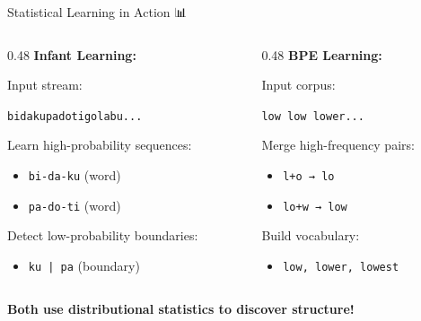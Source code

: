 \documentclass[aspectratio=169]{beamer}
\begin{document}
\begin{frame}[shrink=10]{Statistical Learning in Action 📊}
    \begin{columns}[T]
        \begin{column}{0.48\textwidth}
            \textbf{Infant Learning:}

            Input stream:
            \begin{center}
                \texttt{bidakupadotigolabu...}
            \end{center}

            Learn high-probability sequences:
            \begin{itemize}\setlength{\itemsep}{0pt}
                \item \texttt{bi-da-ku} (word)
                \item \texttt{pa-do-ti} (word)
            \end{itemize}

            Detect low-probability boundaries:
            \begin{itemize}\setlength{\itemsep}{0pt}
                \item \texttt{ku | pa} (boundary)
            \end{itemize}
        \end{column}
        \begin{column}{0.48\textwidth}
            \textbf{BPE Learning:}

            Input corpus:
            \begin{center}
                \texttt{low low lower...}
            \end{center}

            Merge high-frequency pairs:
            \begin{itemize}\setlength{\itemsep}{0pt}
                \item \texttt{l+o → lo}
                \item \texttt{lo+w → low}
            \end{itemize}

            Build vocabulary:
            \begin{itemize}\setlength{\itemsep}{0pt}
                \item \texttt{low, lower, lowest}
            \end{itemize}
        \end{column}
    \end{columns}

    \vspace{1em}
    \textbf{Both use distributional statistics to discover structure!} 🎯
\end{frame}
\end{document}
